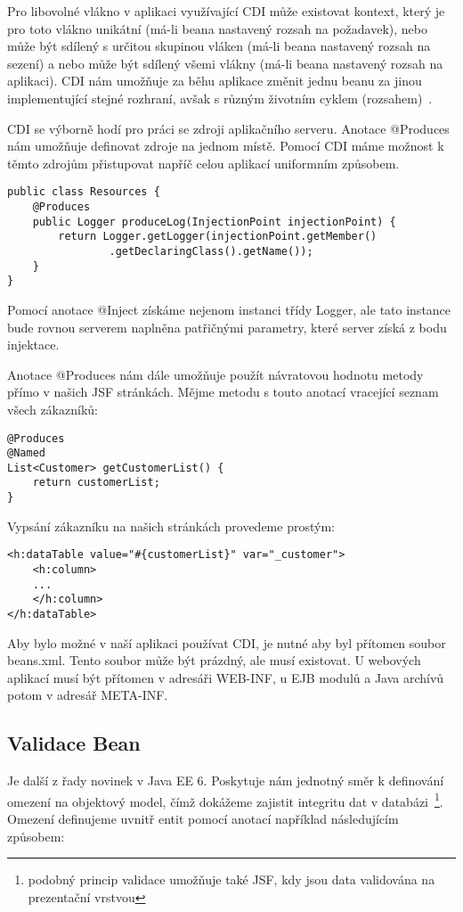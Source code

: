 \documentclass[122pt,oneside]{fithesis}
\begin{document}
Pro libovolné vlákno v aplikaci využívající CDI může existovat kontext, který je pro toto vlákno unikátní (má-li beana nastavený rozsah na požadavek), nebo může být sdílený s určitou skupinou vláken (má-li beana nastavený rozsah na sezení) a nebo může být sdílený všemi vlákny (má-li beana nastavený rozsah na aplikaci). CDI nám umožňuje za běhu aplikace změnit jednu beanu za jinou implementující stejné rozhraní, avšak s různým životním cyklem (rozsahem)~\cite{weld}.

CDI se výborně hodí pro práci se zdroji aplikačního serveru. Anotace @Produces nám umožňuje definovat zdroje na jednom místě. Pomocí CDI máme možnost k těmto zdrojům přistupovat napříč celou aplikací uniformním způsobem.

\begin{lstlisting}
public class Resources {
	@Produces
	public Logger produceLog(InjectionPoint injectionPoint) {
		return Logger.getLogger(injectionPoint.getMember()
				.getDeclaringClass().getName());
	}
}
\end{lstlisting}

Pomocí anotace @Inject získáme nejenom instanci třídy Logger, ale tato instance bude rovnou serverem naplněna patřičnými parametry, které server získá z bodu injektace.

Anotace @Produces nám dále umožňuje použít návratovou hodnotu metody přímo v našich JSF stránkách. Mějme metodu s touto anotací vracející seznam všech zákazníků:

\begin{lstlisting}
@Produces
@Named
List<Customer> getCustomerList() {
	return customerList;
}
\end{lstlisting}

Vypsání zákazníku na našich stránkách provedeme prostým:

\begin{lstlisting}
<h:dataTable value="#{customerList}" var="_customer">
	<h:column>
	...
	</h:column>
</h:dataTable>
\end{lstlisting}

Aby bylo možné v naší aplikaci používat CDI, je nutné aby byl přítomen soubor beans.xml. Tento soubor může být prázdný, ale musí existovat. U webových aplikací musí být přítomen v adresáři WEB-INF, u EJB modulů a Java archívů potom v adresář META-INF.

\subsection{Validace Bean}
Je další z řady novinek v Java EE 6. Poskytuje nám jednotný směr k definování omezení na objektový model, čímž dokážeme zajistit integritu dat v databázi~\footnote{podobný princip validace umožňuje také JSF, kdy jsou data validována na prezentační vrstvou}. Omezení definujeme uvnitř entit pomocí anotací například následujícím způsobem:
\end{document}
